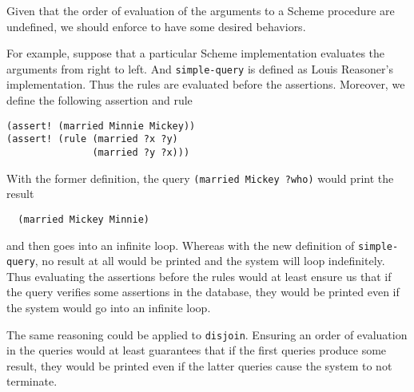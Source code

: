\documentclass[a4paper,12pt]{article}
\begin{document}
Given that the order of evaluation of the arguments to a Scheme
procedure are undefined, we should enforce to have some desired
behaviors.

For example, suppose that a particular Scheme implementation evaluates
the arguments from right to left.  And \lstinline!simple-query! is
defined as Louis Reasoner's implementation.  Thus the rules are
evaluated before the assertions.  Moreover, we define the following
assertion and rule

\begin{lstlisting}
(assert! (married Minnie Mickey))
(assert! (rule (married ?x ?y)
               (married ?y ?x)))
\end{lstlisting}

With the former definition, the query
\lstinline!(married Mickey ?who)!  would print the result
\begin{lstlisting}
  (married Mickey Minnie)
\end{lstlisting}
and then goes into an infinite loop.  Whereas with the new definition
of \lstinline!simple-query!, no result at all would be printed and the
system will loop indefinitely.  Thus evaluating the assertions before
the rules would at least ensure us that if the query verifies some
assertions in the database, they would be printed even if the system
would go into an infinite loop.

\medskip
The same reasoning could be applied to \lstinline!disjoin!.  Ensuring
an order of evaluation in the queries would at least guarantees that
if the first queries produce some result, they would be printed even
if the latter queries cause the system to not terminate.
\end{document}
